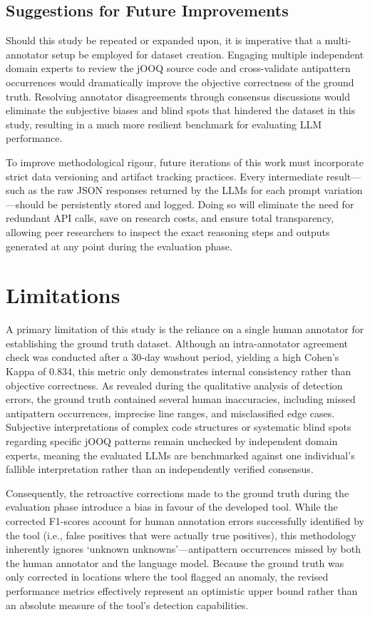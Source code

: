 \subsection{Suggestions for Future Improvements}

Should this study be repeated or expanded upon, it is imperative that a multi-annotator setup be employed for dataset creation. Engaging multiple independent domain experts to review the jOOQ source code and cross-validate antipattern occurrences would dramatically improve the objective correctness of the ground truth. Resolving annotator disagreements through consensus discussions would eliminate the subjective biases and blind spots that hindered the dataset in this study, resulting in a much more resilient benchmark for evaluating LLM performance.

To improve methodological rigour, future iterations of this work must incorporate strict data versioning and artifact tracking practices. Every intermediate result—such as the raw JSON responses returned by the LLMs for each prompt variation—should be persistently stored and logged. Doing so will eliminate the need for redundant API calls, save on research costs, and ensure total transparency, allowing peer researchers to inspect the exact reasoning steps and outputs generated at any point during the evaluation phase.

\section{Limitations}\label{sec:limitations}

A primary limitation of this study is the reliance on a single human annotator for establishing the ground truth dataset. Although an intra-annotator agreement check was conducted after a 30-day washout period, yielding a high Cohen's Kappa of \num{0.834}, this metric only demonstrates internal consistency rather than objective correctness. As revealed during the qualitative analysis of detection errors, the ground truth contained several human inaccuracies, including missed antipattern occurrences, imprecise line ranges, and misclassified edge cases. Subjective interpretations of complex code structures or systematic blind spots regarding specific jOOQ patterns remain unchecked by independent domain experts, meaning the evaluated LLMs are benchmarked against one individual's fallible interpretation rather than an independently verified consensus.

Consequently, the retroactive corrections made to the ground truth during the evaluation phase introduce a bias in favour of the developed tool. While the corrected F1-scores account for human annotation errors successfully identified by the tool (i.e., false positives that were actually true positives), this methodology inherently ignores ‘unknown unknowns’—antipattern occurrences missed by both the human annotator and the language model. Because the ground truth was only corrected in locations where the tool flagged an anomaly, the revised performance metrics effectively represent an optimistic upper bound rather than an absolute measure of the tool's detection capabilities.

